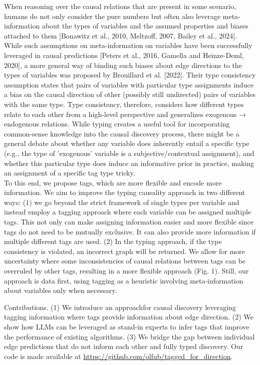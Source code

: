 \documentclass[10pt]{article}
\begin{document}
When reasoning over the causal relations that are present in some scenario, humans do not only consider the pure numbers but often also leverage meta-information about the types of variables and the assumed properties and biases attached to them [Bonawitz et al., 2010, Meltzoff, 2007, Bailey et al., 2024]. While such assumptions on meta-information on variables have been successfully leveraged in causal predictions [Peters et al., 2016, Gamella and Heinze-Deml, 2020], a more general way of binding such biases about edge directions to the types of variables was proposed by Brouillard et al. [2022]. Their type consistency assumption states that pairs of variables with particular type assignments induce a bias on the causal direction of other (possibly still undirected) pairs of variables with the same type. Type consistency, therefore, considers how different types relate to each other from a high-level perspective and generalizes exogenous → endogenous relations. While typing creates a useful tool for incorporating common-sense knowledge into the causal discovery process, there might be a general debate about whether any variable does inherently entail a specific type (e.g., the type of 'exogenous' variable is a subjective/contextual assignment), and whether this particular type does induce an informative prior in practice, making an assignment of a specific tag type tricky.\\
To this end, we propose tags, which are more flexible and encode more information. We aim to improve the typing causality approach in two different ways: (1) we go beyond the strict framework of single types per variable and instead employ a tagging approach where each variable can be assigned multiple tags. This not only can make assigning information easier and more flexible since tags do not need to be mutually exclusive. It can also provide more information if multiple different tags are used. (2) In the typing approach, if the type consistency is violated, an incorrect graph will be returned. We allow for more uncertainty where some inconsistencies of causal relations between tags can be overruled by other tags, resulting in a more flexible approach (Fig. 1). Still, our approach is data first, using tagging as a heuristic involving meta-information about variables only when necessary.

Contributions. (1) We introduce an approachfor causal discovery leveraging tagging information where tags provide information about edge direction. (2) We show how LLMs can be leveraged as stand-in experts to infer tags that improve the performance of existing algorithms. (3) We bridge the gap between individual edge predictions that do not inform each other and fully typed discovery. Our code is made available at \href{https://github.com/olfub/tagged_for_direction}{https://github.com/olfub/tagged\_for\_direction}.
\end{document}
